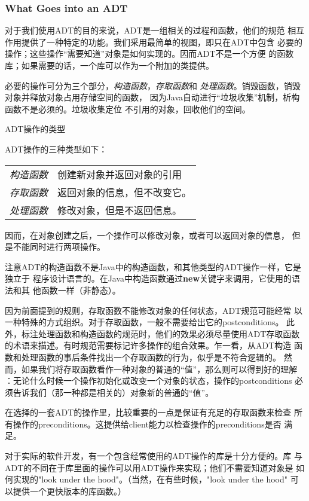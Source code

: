 \subsubsection{What Goes into an ADT}
对于我们使用ADT的目的来说，ADT是一组相关的过程和函数，他们的规范
相互作用提供了一种特定的功能。我们采用最简单的视图，即只在ADT中包含
必要的操作；这些操作“需要知道”对象是如何实现的。因而ADT不是一个方便
的函数库；如果需要的话，一个库可以作为一个附加的类提供。

必要的操作可分为三个部分，\emph{构造函数}，\emph{存取函数}和
\emph{处理函数}。销毁函数，销毁对象并释放对象占用存储空间的函数，
因为Java自动进行“垃圾收集”机制，析构函数不是必须的。垃圾收集定位
不引用的对象，回收他们的空间。

\begin{example}
ADT操作的类型

ADT操作的三种类型如下：

\begin{tabular}{ll}
    \emph{构造函数} & 创建新对象并返回对象的引用\\
    \emph{存取函数} & 返回对象的信息，但不改变它。\\
    \emph{处理函数} & 修改对象，但是不返回信息。\\
\end{tabular}

因而，在对象创建之后，一个操作可以修改对象，或者可以返回对象的信息，
但是不能同时进行两项操作。
\end{example}

注意ADT的构造函数不是Java中的构造函数，和其他类型的ADT操作一样，它是独立于
程序设计语言的。在Java中构造函数通过\textbf{new}关键字来调用，它使用的语法和其
他函数一样（非静态）。

因为前面提到的规则，存取函数不能修改对象的任何状态，ADT规范可能经常
以一种特殊的方式组织。对于存取函数，一般不需要给出它的postconditions。
此外，标注处理函数和构造函数的规范时，他们的效果必须尽量使用ADT存取函数
的术语来描述。有时规范需要标记许多操作的组合效果。乍一看，从ADT构造
函数和处理函数的事后条件找出一个存取函数的行为，似乎是不符合逻辑的。
然而，如果我们将存取函数看作一种对象的普通的“值”，那么则可以得到好的理解
：无论什么时候一个操作初始化或改变一个对象的状态，操作的postconditions
必须告诉我们（那一种都是相关的）对象新的普通的“值”。

在选择的一套ADT的操作里，比较重要的一点是保证有充足的存取函数来检查
所有操作的preconditions。这提供给client能力以检查操作的preconditions是否
满足。

对于实际的软件开发，有一个包含经常使用的ADT操作的库是十分方便的。库
与ADT的不同在于库里面的操作可以用ADT操作来实现；他们不需要知道对象是
如何实现的"look under the hood"。（当然，在有些时候，"look under the hood"
可以提供一个更快版本的库函数。）


